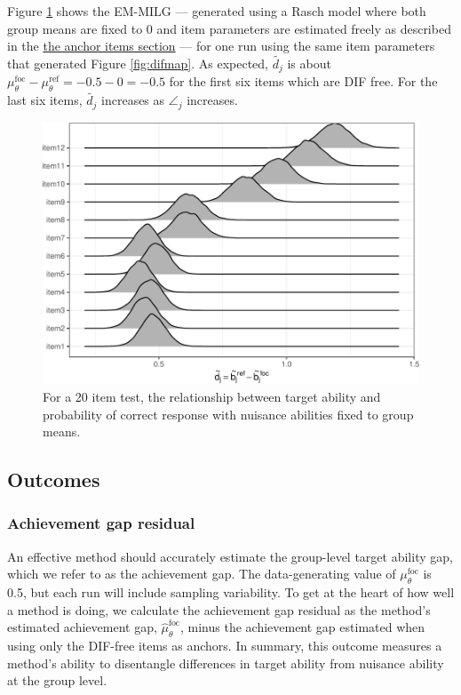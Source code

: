 \documentclass[
  11pt,
]{article}
\begin{document}
Figure \ref{fig:simemmlg} shows the EM-MILG --- generated using a Rasch model where both group means are fixed to 0 and item parameters are estimated freely as described in the \protect\hyperlink{anchoritems}{the anchor items section} --- for one run using the same item parameters that generated Figure \ref{fig:difmap}. As expected, \(\tilde{d_j}\) is about \(\mu_\theta^\text{foc} - \mu_\theta^\text{ref} = -0.5 - 0 = -0.5\) for the first six items which are DIF free. For the last six items, \(\tilde{d_j}\) increases as \(\angle_j\) increases.

\begin{figure}[H]

{\centering \includegraphics[width=0.7\linewidth]{paper_files/figure-latex/simemmlg-1} 

}

\caption{For a 20 item test, the relationship between target ability and probability of correct response with nuisance abilities fixed to group means.}\label{fig:simemmlg}
\end{figure}

\hypertarget{outcomes}{%
\subsection{Outcomes}\label{outcomes}}

\hypertarget{achievement-gap-residual}{%
\subsubsection{Achievement gap residual}\label{achievement-gap-residual}}

An effective method should accurately estimate the group-level target ability gap, which we refer to as the achievement gap. The data-generating value of \(\mu_\theta^\text{foc}\) is 0.5, but each run will include sampling variability. To get at the heart of how well a method is doing, we calculate the achievement gap residual as the method's estimated achievement gap, \(\hat\mu_\theta^\text{foc}\), minus the achievement gap estimated when using only the DIF-free items as anchors. In summary, this outcome measures a method's ability to disentangle differences in target ability from nuisance ability at the group level.
\end{document}
